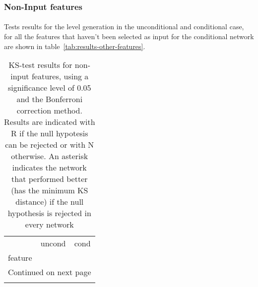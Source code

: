 \subsubsection{Non-Input features}
\paragraph{} Tests results for the level generation in the unconditional and conditional case, for all the features that haven't been selected as input for the conditional network are shown in table~\ref{tab:results-other-features}.

\begin{longtable}{lll}
	\caption[Test results for non input features]{ \small KS-test results for non-input features, using a significance level of 0.05 and the Bonferroni correction method. Results are indicated with R if the null hypotesis can be rejected or with N otherwise. An asterisk indicates the network that performed better (has the minimum KS distance) if the null hypothesis is rejected in every network}\\
	\toprule
	{} & uncond & cond \\
	feature                       &        &      \\
	\midrule
	\endhead
	\midrule
	\multicolumn{3}{r}{{Continued on next page}} \\
	\midrule
	\endfoot
	

\end{longtable}
